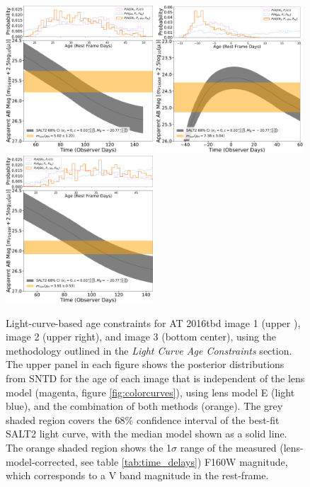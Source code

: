 \documentclass[12pt]{article}
\def\SNABC{AT 2016tbd\xspace}
\begin{document}
\begin{figure}
    \centering
    \includegraphics[width=0.49\textwidth]{Paper/Figures/lightcurve_image1.pdf}
    \includegraphics[width=0.49\textwidth]{Paper/Figures/lightcurve_image2.pdf}
    \includegraphics[width=0.49\textwidth]{Paper/Figures/lightcurve_image3.pdf}
    \caption{Light-curve-based age constraints for \SNABC image 1 (upper ), image 2 (upper right), and image 3 (bottom center), using the methodology outlined in the \textit{Light Curve Age Constraints} section. The upper panel in each figure shows the posterior distributions from SNTD for the age of each image that is independent of the lens model (magenta, figure \ref{fig:colorcurves}), using lens model E (light blue), and the combination of both methods (orange). The grey shaded region covers the 68\% confidence interval of the best-fit SALT2 light curve, with the median model shown as a solid line. The orange shaded region shows the 1$\sigma$ range of the measured (lens-model-corrected, see table \ref{tab:time_delays}) F160W magnitude, which corresponds to a V band magnitude in the rest-frame.}
    \label{fig:lightcurves}
\end{figure}
\end{document}
